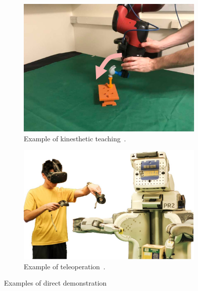 \begin{figure}[tb]
     \centering
     \begin{subfigure}[b]{0.45\textwidth}
         \includegraphics[width=\textwidth]{figures/images/direct_demonstration/kinesthetic.jpg}
         \caption{Example of kinesthetic teaching~\cite{johns2021coarse_to_fine}.}
         \label{fig:kinesthetic}
     \end{subfigure}
     \hfill
     \begin{subfigure}[b]{0.5\textwidth}
         \includegraphics[width=\textwidth]{figures/images/direct_demonstration/teleoperation.jpg}
         \caption{Example of teleoperation~\cite{zhang2018deep_vr_teleoperation}.}
         \vspace{0.46cm}
         \label{fig:teleoperation}
     \end{subfigure}

    \caption{Examples of direct demonstration}
    \label{fig:direct_demonstrations}
\end{figure}

